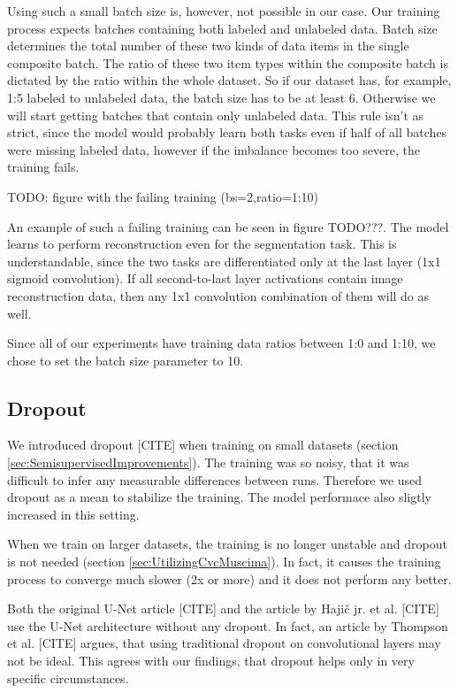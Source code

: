 Using such a small batch size is, however, not possible in our case. Our training process expects batches containing both labeled and unlabeled data. Batch size determines the total number of these two kinds of data items in the single composite batch. The ratio of these two item types within the composite batch is dictated by the ratio within the whole dataset. So if our dataset has, for example, 1:5 labeled to unlabeled data, the batch size has to be at least 6. Otherwise we will start getting batches that contain only unlabeled data. This rule isn't as strict, since the model would probably learn both tasks even if half of all batches were missing labeled data, however if the imbalance becomes too severe, the training fails.

TODO: figure with the failing training (bs=2,ratio=1:10)

An example of such a failing training can be seen in figure TODO???. The model learns to perform reconstruction even for the segmentation task. This is understandable, since the two tasks are differentiated only at the last layer (1x1 sigmoid convolution). If all second-to-last layer activations contain image reconstruction data, then any 1x1 convolution combination of them will do as well.

Since all of our experiments have training data ratios between 1:0 and 1:10, we chose to set the batch size parameter to 10.


\subsection{Dropout}
\label{sec:Dropout}

We introduced dropout [CITE] when training on small datasets (section \ref{sec:SemisupervisedImprovements}). The training was so noisy, that it was difficult to infer any measurable differences between runs. Therefore we used dropout as a mean to stabilize the training. The model performace also sligtly increased in this setting.

When we train on larger datasets, the training is no longer unstable and dropout is not needed (section \ref{sec:UtilizingCvcMuscima}). In fact, it causes the training process to converge much slower (2x or more) and it does not perform any better.

Both the original U-Net article [CITE] and the article by Hajič jr. et al. [CITE] use the U-Net architecture without any dropout. In fact, an article by Thompson et al. [CITE] argues, that using traditional dropout on convolutional layers may not be ideal. This agrees with our findings, that dropout helps only in very specific circumstances.

